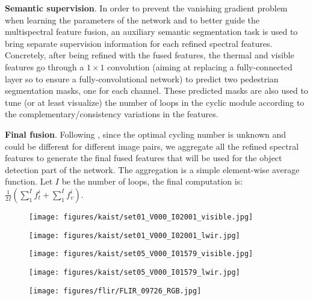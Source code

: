 \documentclass{article}
\begin{document}
\noindent
\textbf{Semantic supervision}. In order to prevent the vanishing gradient problem when learning the parameters of the network and to better guide the multispectral feature fusion, an auxiliary semantic segmentation task is used to bring separate supervision information for each refined spectral features. Concretely, after being refined with the fused features, the thermal and visible features go through a $1\times1$ convolution (aiming at replacing a fully-connected layer so to ensure a fully-convolutional network) to predict two pedestrian segmentation masks, one for each channel.
These predicted masks are also used to tune (or at least visualize) the number of loops in the cyclic module according to the complementary/consistency variations in the features.

\noindent
\textbf{Final fusion}. Following \cite{Deraining}, since the optimal cycling number is unknown and could be different for different image pairs, we aggregate all the refined spectral features to generate the final fused features that will be used for the object detection part of the network. The aggregation is a simple element-wise average function. Let $I$ be the number of loops, the final computation is: $\frac{1}{2 I}(\sum_{1}^{I}f_{t}^{i}+\sum_{1}^{I}f_{v}^{i})$. \begin{figure}[]
\centering
\begin{minipage}[b]{.241\linewidth}
  \centering
  \centerline{\texttt{[image: figures/kaist/set01\_V000\_I02001\_visible.jpg]}}
\end{minipage}
\begin{minipage}[b]{.241\linewidth}
  \centering
  \centerline{\texttt{[image: figures/kaist/set01\_V000\_I02001\_lwir.jpg]}}
\end{minipage}
\begin{minipage}[b]{.241\linewidth}
  \centering
  \centerline{\texttt{[image: figures/kaist/set05\_V000\_I01579\_visible.jpg]}}
\end{minipage}
\begin{minipage}[b]{.241\linewidth}
  \centering
  \centerline{\texttt{[image: figures/kaist/set05\_V000\_I01579\_lwir.jpg]}}
\end{minipage}
\begin{minipage}[b]{.241\linewidth}
  \centering
  \centerline{\texttt{[image: figures/flir/FLIR\_09726\_RGB.jpg]}}
\end{minipage}
\begin{minipage}[b]{.241\linewidth}

\end{minipage}
\end{figure}
\end{document}
